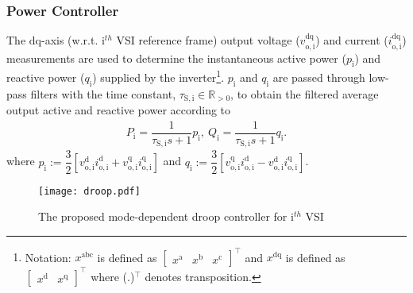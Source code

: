 \documentclass[journal]{IEEEtran}
\begin{document}
\subsubsection{Power Controller}\label{power}
The $\mathrm{d}\mathrm{q}$-axis (w.r.t. $\mathrm{i}^{th}$ VSI reference frame) output voltage ($v^\mathrm{dq}_\mathrm{o,i}$) and current ($i^\mathrm{dq}_\mathrm{o,i}$) measurements are used to determine the instantaneous active power ($p_\mathrm{i}$) and reactive power ($q_\mathrm{i}$) supplied by the inverter\footnote{Notation: $x^\mathrm{abc}$ is defined as $\begin{bmatrix}x^\mathrm{a}& x^\mathrm{b}&x^\mathrm{c}\end{bmatrix}^\top$ and $x^\mathrm{dq}$ is defined as $\begin{bmatrix}x^\mathrm{d}& x^\mathrm{q}\end{bmatrix}^\top$ where (.)$^\top$ denotes transposition.}. $p_\mathrm{i}$ and $q_\mathrm{i}$ are passed through low-pass filters with the time constant, $\tau_\mathrm{S,i} \in \mathbb{R}_{>0}$, to obtain the filtered average output active and reactive power according to
\begin{align}\label{powercal}
    P_\mathrm{i} =  \dfrac{1}{\tau_\mathrm{S,i}s+1}p_\mathrm{i},~Q_\mathrm{i} =  \dfrac{1}{\tau_\mathrm{S,i}s+1}q_\mathrm{i}.
\end{align}
where $p_\mathrm{i}:=\dfrac{3}{2}[v^\mathrm{d}_\mathrm{o,i}i^\mathrm{d}_\mathrm{o,i} + v^\mathrm{q}_\mathrm{o,i}i^\mathrm{q}_\mathrm{o,i}]$ and $q_\mathrm{i}:=\dfrac{3}{2}[v^\mathrm{q}_\mathrm{o,i}i^\mathrm{d}_\mathrm{o,i}-v^\mathrm{d}_\mathrm{o,i}i^\mathrm{q}_\mathrm{o,i}]$.\vspace{1mm}
\begin{figure}[t]
	\centering
    \texttt{[image: droop.pdf]}%
	\caption{The proposed mode-dependent droop controller for $\mathrm{i}^{th}$ VSI}
	\label{fig:droop}
\end{figure}
\end{document}
